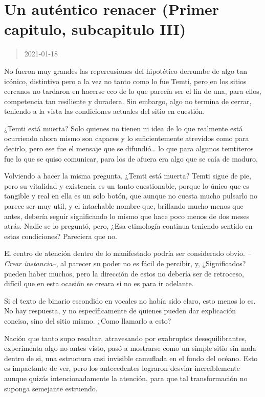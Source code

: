 \documentclass[
  spanish,
]{book}
\begin{document}
\hypertarget{un-autuxe9ntico-renacer-primer-capitulo-subcapitulo-iii}{%
\section{Un auténtico renacer (Primer capitulo, subcapitulo III)}\label{un-autuxe9ntico-renacer-primer-capitulo-subcapitulo-iii}}

\begin{quote}
2021-01-18
\end{quote}

No fueron muy grandes las repercusiones del hipotético derrumbe de algo tan icónico, distintivo pero a la vez no tanto como lo fue Temti, pero en los sitios cercanos no tardaron en hacerse eco de lo que parecía ser el fin de una, para ellos, competencia tan resiliente y duradera. Sin embargo, algo no termina de cerrar, teniendo a la vista las condiciones actuales del sitio en cuestión.

¿Temti está muerta? Solo quienes no tienen ni idea de lo que realmente está ocurriendo ahora mismo son capaces y lo suficientemente atrevidos como para decirlo, pero ese fue el mensaje que se difundió\ldots{} lo que para algunos temtiteros fue lo que se quiso comunicar, para los de afuera era algo que se caía de maduro.

Volviendo a hacer la misma pregunta, ¿Temti está muerta? Temti sigue de pie, pero su vitalidad y existencia es un tanto cuestionable, porque lo único que es tangible y real en ella es un solo botón, que aunque no cuesta mucho pulsarlo no parece ser muy util, y el intachable nombre que, brillando mucho menos que antes, debería seguir significando lo mismo que hace poco menos de dos meses atrás. Nadie se lo preguntó, pero, ¿Esa etimología continua teniendo sentido en estas condiciones? Pareciera que no.

El centro de atención dentro de lo manifestado podría ser considerado obvio. \emph{--Crear instancia--}, al parecer su poder no es fácil de percibir, y, ¿Significados? pueden haber muchos, pero la dirección de estos no debería ser de retroceso, difícil que en esta ocasión se creara si no es para ir adelante.

Si el texto de binario escondido en vocales no había sido claro, esto menos lo es.
No hay respuesta, y no específicamente de quienes pueden dar explicación concisa, sino del sitio mismo. ¿Como llamarlo a esto?

Nación que tanto supo resaltar, atravesando por exabruptos desequilibrantes, experimenta algo no antes visto, pasó a mostrarse como un simple sitio sin nada dentro de si, una estructura casi invisible camuflada en el fondo del océano. Esto es impactante de ver, pero los antecedentes lograron desviar increíblemente aunque quizás intencionadamente la atención, para que tal transformación no suponga semejante estruendo.
\end{document}
